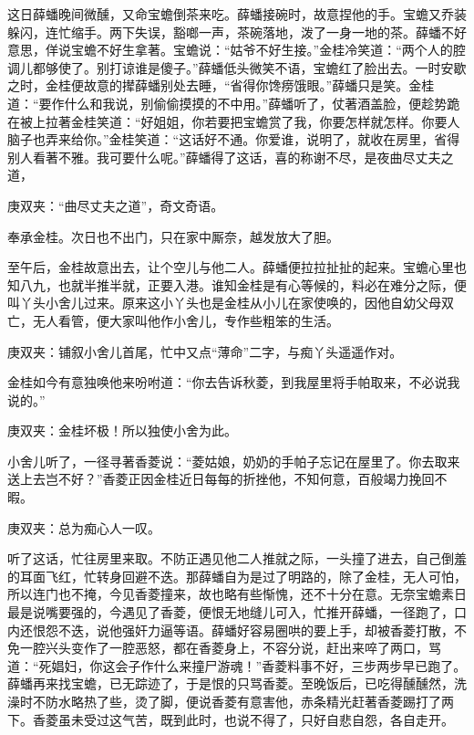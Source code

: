 \begin{parag}
    这日薛蟠晚间微醺，又命宝蟾倒茶来吃。薛蟠接碗时，故意捏他的手。宝蟾又乔装躲闪，连忙缩手。两下失误，豁啷一声，茶碗落地，泼了一身一地的茶。薛蟠不好意思，佯说宝蟾不好生拿著。宝蟾说：“姑爷不好生接。”金桂冷笑道：“两个人的腔调儿都够使了。别打谅谁是傻子。”薛蟠低头微笑不语，宝蟾红了脸出去。一时安歇之时，金桂便故意的撵薛蟠别处去睡，“省得你馋痨饿眼。”薛蟠只是笑。金桂道：“要作什么和我说，别偷偷摸摸的不中用。”薛蟠听了，仗著酒盖脸，便趁势跪在被上拉著金桂笑道：“好姐姐，你若要把宝蟾赏了我，你要怎样就怎样。你要人脑子也弄来给你。”金桂笑道：“这话好不通。你爱谁，说明了，就收在房里，省得别人看著不雅。我可要什么呢。”薛蟠得了这话，喜的称谢不尽，是夜曲尽丈夫之道，\begin{note}庚双夹：“曲尽丈夫之道”，奇文奇语。\end{note}奉承金桂。次日也不出门，只在家中厮奈，越发放大了胆。
\end{parag}


\begin{parag}
    至午后，金桂故意出去，让个空儿与他二人。薛蟠便拉拉扯扯的起来。宝蟾心里也知八九，也就半推半就，正要入港。谁知金桂是有心等候的，料必在难分之际，便叫丫头小舍儿过来。原来这小丫头也是金桂从小儿在家使唤的，因他自幼父母双亡，无人看管，便大家叫他作小舍儿，专作些粗笨的生活。\begin{note}庚双夹：铺叙小舍儿首尾，忙中又点“薄命”二字，与痴丫头遥遥作对。\end{note}金桂如今有意独唤他来吩咐道：“你去告诉秋菱，到我屋里将手帕取来，不必说我说的。”\begin{note}庚双夹：金桂坏极！所以独使小舍为此。\end{note}小舍儿听了，一径寻著香菱说：“菱姑娘，奶奶的手帕子忘记在屋里了。你去取来送上去岂不好？”香菱正因金桂近日每每的折挫他，不知何意，百般竭力挽回不暇。\begin{note}庚双夹：总为痴心人一叹。\end{note}听了这话，忙往房里来取。不防正遇见他二人推就之际，一头撞了进去，自己倒羞的耳面飞红，忙转身回避不迭。那薛蟠自为是过了明路的，除了金桂，无人可怕，所以连门也不掩，今见香菱撞来，故也略有些惭愧，还不十分在意。无奈宝蟾素日最是说嘴要强的，今遇见了香菱，便恨无地缝儿可入，忙推开薛蟠，一径跑了，口内还恨怨不迭，说他强奸力逼等语。薛蟠好容易圈哄的要上手，却被香菱打散，不免一腔兴头变作了一腔恶怒，都在香菱身上，不容分说，赶出来啐了两口，骂道：“死娼妇，你这会子作什么来撞尸游魂！”香菱料事不好，三步两步早已跑了。薛蟠再来找宝蟾，已无踪迹了，于是恨的只骂香菱。至晚饭后，已吃得醺醺然，洗澡时不防水略热了些，烫了脚，便说香菱有意害他，赤条精光赶著香菱踢打了两下。香菱虽未受过这气苦，既到此时，也说不得了，只好自悲自怨，各自走开。
\end{parag}


